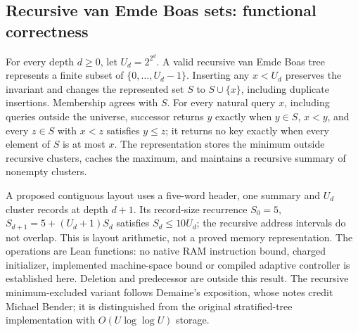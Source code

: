 \begin{result}
\subsection{Recursive van Emde Boas sets: functional correctness}
For every depth $d\geq 0$, let $U_d=2^{2^d}$. A valid recursive van Emde Boas tree
represents a finite subset of $\{0,\ldots,U_d-1\}$. Inserting any $x<U_d$ preserves
the invariant and changes the represented set $S$ to $S\cup\{x\}$, including duplicate
insertions. Membership agrees with $S$. For every natural query $x$, including queries
outside the universe, successor returns $y$ exactly when $y\in S$, $x<y$, and every
$z\in S$ with $x<z$ satisfies $y\leq z$; it returns no key exactly when every element
of $S$ is at most $x$. The representation stores the minimum outside recursive clusters,
caches the maximum, and maintains a recursive summary of nonempty clusters.

A proposed contiguous layout uses a five-word header, one summary and $U_d$ cluster
records at depth $d+1$. Its record-size recurrence
$S_0=5$, $S_{d+1}=5+(U_d+1)S_d$ satisfies $S_d\leq10U_d$; the recursive address
intervals do not overlap. This is layout arithmetic, not a proved memory representation.
The operations are Lean functions: no native RAM instruction bound, charged initializer,
implemented machine-space bound or compiled adaptive controller is established here.
Deletion and predecessor are outside this result. The recursive minimum-excluded variant
follows Demaine's exposition, whose notes credit Michael Bender; it is distinguished from
the original stratified-tree implementation with $O(U\log\log U)$
storage.\citep{Demaine2015VanEmdeBoas,VanEmdeBoasKaasZijlstra1977}
\end{result}

